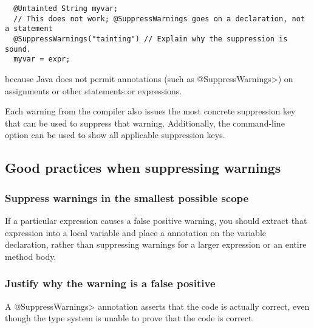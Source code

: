 \begin{Verbatim}
  @Untainted String myvar;
  // This does not work; @SuppressWarnings goes on a declaration, not a statement
  @SuppressWarnings("tainting") // Explain why the suppression is sound.
  myvar = expr;
\end{Verbatim}

\noindent
because Java does not permit annotations (such as \<@SuppressWarnings>) on
assignments or other statements or expressions.



Each warning from the compiler also issues the most concrete
suppression key that can be used to suppress that warning.
Additionally, the  command-line option
can be used to show all applicable suppression keys.


\subsection{Good practices when suppressing warnings\label{suppresswarnings-best-practices}}

\subsubsection{Suppress warnings in the smallest possible scope\label{suppresswarnings-best-practices-smallest-scope}}

If a particular expression causes a
false positive warning, you should extract that expression into a local variable
and place a  annotation on the variable
declaration, rather than suppressing warnings for a larger expression or an
entire method body.


\subsubsection{Justify why the warning is a false positive\label{suppresswarnings-best-practices-justification}}

A \<@SuppressWarnings> annotation asserts that the code is actually
correct, even though the type system is unable to prove that the code is
correct.

